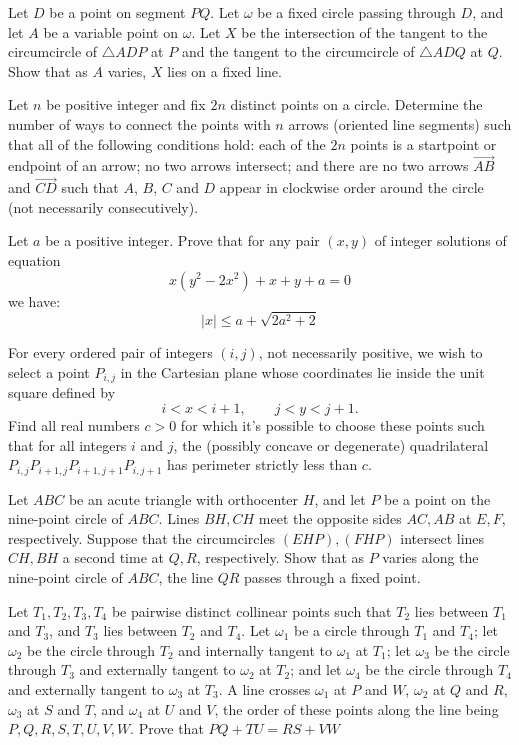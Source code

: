 \documentclass[11pt]{scrartcl}
\begin{document}
\begin{problem}[8152181601565653036]
Let \(D\) be a point on segment \(PQ\). Let \(\omega\) be a fixed circle passing through \(D\), and let \(A\) be a variable point on \(\omega\). Let \(X\) be the intersection of the tangent to the circumcircle of \(\triangle ADP\) at \(P\) and the tangent to the circumcircle of \(\triangle ADQ\) at \(Q\). Show that as \(A\) varies, \(X\) lies on a fixed line.
\end{problem}
\begin{problem}[8156079118189111754]
	Let $n$ be positive integer and fix $2n$ distinct points on a circle. Determine the number of ways to connect the points with $n$ arrows (oriented line segments) such that all of the following conditions hold:
each of the $2n$ points is a startpoint or endpoint of an arrow;
no two arrows intersect; and
there are no two arrows $\overrightarrow{AB}$ and $\overrightarrow{CD}$ such that $A$, $B$, $C$ and $D$ appear in clockwise order around the circle (not necessarily consecutively).
\end{problem}
\begin{problem}[8188286074852188554]
	Let $a$ be a positive integer. Prove that for any pair $(x,y)$ of integer solutions of equation$$x(y^2-2x^2)+x+y+a=0$$we have:$$|x| \leqslant a+\sqrt{2a^2+2}$$
\end{problem}
\begin{problem}[8209367948889736949]
For every ordered pair of integers $(i,j)$, not necessarily positive, we wish to select a point $P_{i,j}$ in the Cartesian plane whose coordinates lie inside the unit square defined by
\[ i < x < i+1, \qquad j < y < j+1. \]Find all real numbers $c > 0$ for which it's possible to choose these points such that for all integers $i$ and $j$, the (possibly concave or degenerate) quadrilateral $P_{i,j} P_{i+1,j} P_{i+1,j+1} P_{i,j+1}$ has perimeter strictly less than $c$.
\end{problem}
\begin{problem}[8255863576892581507]
	Let $ABC$ be an acute triangle with orthocenter $H$, and let $P$ be a point on the nine-point circle of $ABC$. Lines $BH, CH$ meet the opposite sides $AC, AB$ at $E, F$, respectively. Suppose that the circumcircles $(EHP), (FHP)$ intersect lines $CH, BH$ a second time at $Q,R$, respectively. Show that as $P$ varies along the nine-point circle of $ABC$, the line $QR$ passes through a fixed point.
\end{problem}
\begin{problem}[8265057113266691052]
Let $T_1, T_2, T_3, T_4$ be pairwise distinct collinear points such that $T_2$ lies between $T_1$ and $T_3$, and $T_3$ lies between $T_2$ and $T_4$. Let $\omega_1$ be a circle through $T_1$ and $T_4$; let $\omega_2$ be the circle through $T_2$ and internally tangent to $\omega_1$ at $T_1$; let $\omega_3$ be the circle through $T_3$ and externally tangent to $\omega_2$ at $T_2$; and let $\omega_4$ be the circle through $T_4$ and externally tangent to $\omega_3$ at $T_3$. A line crosses $\omega_1$ at $P$ and $W$, $\omega_2$ at $Q$ and $R$, $\omega_3$ at $S$ and $T$, and $\omega_4$ at $U$ and $V$, the order of these points along the line being $P,Q,R,S,T,U,V,W$. Prove that $PQ + TU = RS + VW$
\end{problem}
\end{document}
